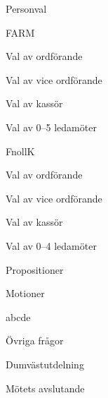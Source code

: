 \documentclass{sektionsmote}
\begin{document}
\begin{ootd}
\item{Personval}
\begin{ootd}
    \item FARM
    \begin{ootd}
        \item Val av ordförande
        \item Val av vice ordförande
        \item Val av kassör
        \item Val av 0--5 ledamöter
    \end{ootd}
    \item FnollK
    \begin{ootd}
        \item Val av ordförande
        \item Val av vice ordförande
        \item Val av kassör
        \item Val av 0--4 ledamöter
    \end{ootd}
\end{ootd}

\item{Propositioner}

\item{Motioner}
\begin{ootd}
    \item abcde
\end{ootd}

\item{Övriga frågor}

\item{Dumvästutdelning}

\item{Mötets avslutande}
\end{ootd}


\begin{bilagor}


\end{bilagor}
\end{document}
